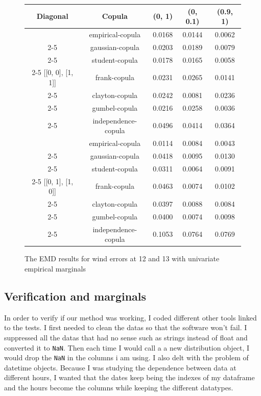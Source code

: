 \documentclass{article}
\begin{document}
\begin{figure}[h]
\centering
\begin{tabular}{|c|c|c|c|c|}
\hline
Diagonal & Copula & (0, 1) & (0, 0.1) & (0.9, 1) \\ \hline
 & empirical-copula &0.0168 & 0.0144 &0.0062 \\ \cline{2-5}
 & gaussian-copula & 0.0203 & 0.0189 & 0.0079 \\ \cline{2-5}
 & student-copula & 0.0178 & 0.0165 & 0.0058 \\ \cline{2-5}
[[0, 0], [1, 1]] & frank-copula & 0.0231 & 0.0265 & 0.0141 \\ \cline{2-5}
 & clayton-copula 
& 0.0242 & 0.0081 & 0.0236 \\ \cline{2-5}
 & gumbel-copula & 0.0216 & 0.0258 & 0.0036 \\ \cline{2-5}
 & independence-copula & 0.0496 & 0.0414 & 0.0364 \\ \hline
   & empirical-copula & 0.0114 & 0.0084 & 0.0043 \\ \cline{2-5}
& gaussian-copula & 0.0418 & 0.0095 & 0.0130 \\\cline{2-5}
& student-copula & 0.0311 & 0.0064 & 0.0091 \\\cline{2-5}
[[0, 1], [1, 0]]& frank-copula & 0.0463 & 0.0074 & 0.0102 \\ \cline{2-5}
& clayton-copula & 0.0397 & 0.0088 & 0.0084 \\\cline{2-5}
& gumbel-copula & 0.0400 & 0.0074 & 0.0098 \\ \cline{2-5}
& independence-copula & 0.1053 & 0.0764 & 0.0769\\ \hline
 
\end{tabular}
\caption{The EMD results for wind errors at 12 and 13 with univariate empirical marginals}
\end{figure}


\subsection{Verification and marginals}

In order to verify if our method was working, I coded different other tools linked to the tests. I first needed to clean the datas so that the software won't fail. I suppressed all the datas that had no sense such as strings instead of float and converted it to \texttt{NaN}. Then each time I would call a a new distribution object, I would drop the \texttt{NaN} in the columns i am using. I also delt with the problem of datetime objects. Because I was studying the dependence between data at different hours, I wanted that the dates keep being the indexes of my dataframe and the hours become the columns while keeping the different datatypes.
\end{document}
